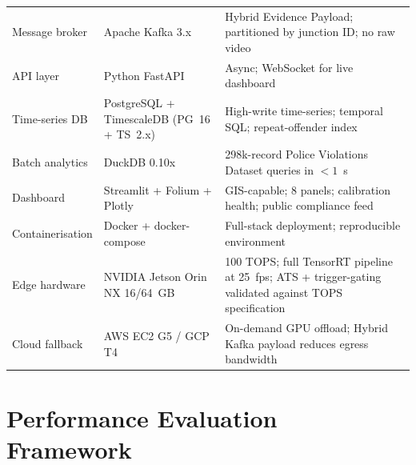 \documentclass[11pt,a4paper]{article}
\begin{document}
\begin{longtable}{L{3.5cm} L{4.5cm} L{6.5cm}}
    Message broker & Apache Kafka 3.x & Hybrid Evidence Payload; partitioned by junction ID; no raw video \\
    API layer & Python FastAPI & Async; WebSocket for live dashboard \\
    Time-series DB & PostgreSQL + TimescaleDB (PG~16 + TS~2.x) & High-write time-series; temporal SQL; repeat-offender index \\
    Batch analytics & DuckDB 0.10x & 298k-record Police Violations Dataset queries in $< 1$~s \\
    Dashboard & Streamlit + Folium + Plotly & GIS-capable; 8 panels; calibration health; public compliance feed \\
    Containerisation & Docker + docker-compose & Full-stack deployment; reproducible environment \\
    Edge hardware & NVIDIA Jetson Orin NX 16/64~GB & 100 TOPS; full TensorRT pipeline at 25~fps; ATS + trigger-gating validated against TOPS specification \\
    Cloud fallback & AWS EC2 G5 / GCP T4 & On-demand GPU offload; Hybrid Kafka payload reduces egress bandwidth \\
\end{longtable}

\section{Performance Evaluation Framework}
\label{sec:eval}
\end{document}
